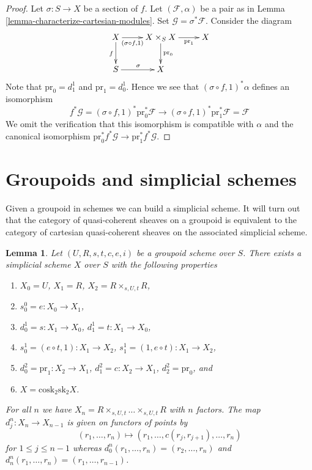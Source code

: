 \documentclass{stacks-project}
\theoremstyle{plain}
\newtheorem{lemma}[subsection]{Lemma}
\theoremstyle{definition}
\theoremstyle{remark}
\numberwithin{equation}{subsection}
\begin{document}
\begin{proof}
Let $\sigma : S \to X$ be a section of $f$. Let $(\mathcal{F}, \alpha)$
be a pair as in Lemma \ref{lemma-characterize-cartesian-modules}.
Set $\mathcal{G} = \sigma^*\mathcal{F}$. Consider the diagram
$$
\xymatrix{
X \ar[r]_-{(\sigma \circ f, 1)} \ar[d]_f &
X \times_S X \ar[d]^{\text{pr}_0} \ar[r]_-{\text{pr}_1} & X \\
S \ar[r]^\sigma & X
}
$$
Note that $\text{pr}_0 = d^1_1$ and $\text{pr}_1 = d^1_0$. Hence we
see that $(\sigma \circ f, 1)^*\alpha$ defines an isomorphism
$$
f^*\mathcal{G} = (\sigma \circ f, 1)^*\text{pr}_0^*\mathcal{F}
\longrightarrow
(\sigma \circ f, 1)^*\text{pr}_1^*\mathcal{F} = \mathcal{F}
$$
We omit the verification that this isomorphism is compatible
with $\alpha$ and the canonical isomorphism
$\text{pr}_0^*f^*\mathcal{G} \to \text{pr}_1^*f^*\mathcal{G}$.
\end{proof}






\section{Groupoids and simplicial schemes}
\label{section-groupoids-simplicial}

\noindent
Given a groupoid in schemes we can build a simplicial scheme.
It will turn out that the category of quasi-coherent sheaves on a
groupoid is equivalent to the category of cartesian quasi-coherent
sheaves on the associated simplicial scheme.

\begin{lemma}
\label{lemma-groupoid-simplicial}
Let $(U, R, s, t, c, e, i)$ be a groupoid scheme over $S$.
There exists a simplicial scheme $X$ over $S$
with the following properties
\begin{enumerate}
\item $X_0 = U$, $X_1 = R$, $X_2 = R \times_{s, U, t} R$,
\item $s_0^0 = e : X_0 \to X_1$,
\item $d^1_0 = s : X_1 \to X_0$, $d^1_1 = t : X_1 \to X_0$,
\item $s_0^1 = (e \circ t, 1) : X_1 \to X_2$,
$s_1^1 = (1, e \circ t) : X_1 \to X_2$,
\item $d^2_0 = \text{pr}_1 : X_2 \to X_1$,
$d^2_1 = c : X_2 \to X_1$,
$d^2_2 = \text{pr}_0$, and
\item $X = \text{cosk}_2 \text{sk}_2 X$.
\end{enumerate}
For all $n$ we have $X_n = R \times_{s, U, t} \ldots \times_{s, U, t} R$
with $n$ factors. The map $d^n_j : X_n \to X_{n - 1}$ is given on
functors of points by
$$
(r_1, \ldots, r_n) \longmapsto (r_1, \ldots, c(r_j, r_{j + 1}), \ldots, r_n)
$$
for $1 \leq j \leq n - 1$ whereas
$d^n_0(r_1, \ldots, r_n) = (r_2, \ldots, r_n)$ and
$d^n_n(r_1, \ldots, r_n) = (r_1, \ldots, r_{n - 1})$.
\end{lemma}
\end{document}
